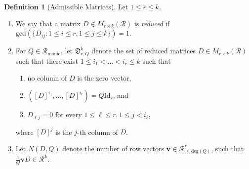 \documentclass[11pt,a4paper,reqno]{amsart}
\def\gcd{\mathrm{gcd}}
\def\deg{\mathrm{deg}}
\newcommand{\Rmo}{\mathcal R_{\text{monic}}}
\theoremstyle{definition}
\newtheorem{definition}[theorem]{Definition}
\theoremstyle{remark}
\numberwithin{equation}{section}
\begin{document}
\begin{definition}[Admissible Matrices]\label{def: admissible matrix}
Let $1\leq r\leq k$.
\begin{enumerate}
    \item We say that a matrix $D\in M_{r\times k}(\mathcal{R})$ is \emph{reduced} if $\gcd(\{D_{ij} : 1\leq i\leq r,1\leq j\leq k\})=1$. 
    \item For $Q\in \Rmo$, let $\mathfrak{D}^k_{r,Q}$ denote the set of reduced matrices $D\in M_{r\times k}(\mathcal R)$ such that there exist $1\leq i_1<\dots<i_r\leq k$ such that
    \begin{enumerate}
        \item no column of $D$ is the zero vector,
        \item $([D]^{i_1},\dots,[D]^{i_r})=Q\mathrm{Id}_r$, and
        \item $D_{\ell j}=0$ for every $1\leq \ell\leq r, 1\leq j<i_\ell$,
    \end{enumerate}
    where $[D]^j$ is the $j$-th column of $D$. 
    \item Let $N(D,Q)$ denote the number of row vectors $\mathbf{v}\in \mathcal{R}^{r}_{\le \deg(Q)}$, such that $\frac{1}{Q}\mathbf{v}D\in \mathcal{R}^k$.
\end{enumerate} 
\end{definition}
\end{document}
